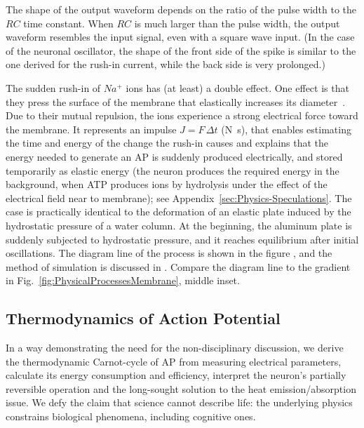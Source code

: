 The shape of the output waveform depends on the ratio of the pulse width to the $RC$ time constant. When $RC$ is much larger than the pulse width, the output waveform resembles the input signal, even with a square wave input. (In the case of the neuronal oscillator, the shape of the front side of the spike is similar to the one derived for the rush-in current, while the back side is very prolonged.)

The sudden rush-in of
$Na^+$ ions has (at least) a double effect. 
One effect is that they press the surface of the membrane that
elastically increases its diameter~\cite{NeuronalDeformation:2020}.
 Due to their mutual repulsion,
the ions experience a strong electrical force toward the membrane. It represents an impulse $J=F\,\Delta t$ (N\, s), that enables estimating the time and energy of the 
change the rush-in causes and explains that the energy needed to 
generate an \gls{AP} is suddenly produced electrically, 
and stored temporarily as elastic energy (the neuron produces the required energy in the background, when \gls{ATP} produces ions by hydrolysis under the effect of the electrical field near to membrane); see Appendix~\ref{sec:Physics-Speculations}. 
The case is practically identical to
the deformation of an elastic plate induced by the hydrostatic pressure of a water column. At the beginning, the aluminum plate is suddenly subjected to hydrostatic pressure, and it reaches equilibrium after initial oscillations. The diagram line of the process is shown in the figure
\cite{HydrostaticWaterColumn:2021}, and the method of simulation is discussed in \cite{Hydrostatic_SPHinXsys:2021}. Compare the diagram line to the
gradient in Fig.~\ref{fig:PhysicalProcessesMembrane}, middle inset.


\subsection{Thermodynamics of Action Potential\label{sec:Physics-ThermodynamicsAP}}

 In a way 
demonstrating the need for the non-disciplinary discussion,
we derive the thermodynamic Carnot-cycle of AP from
measuring electrical parameters, calculate its energy consumption and efficiency, interpret the neuron's partially reversible operation and
the long-sought solution to the heat emission/absorption issue.
We defy the claim that science cannot describe life: the underlying physics constrains biological phenomena, including cognitive ones.



